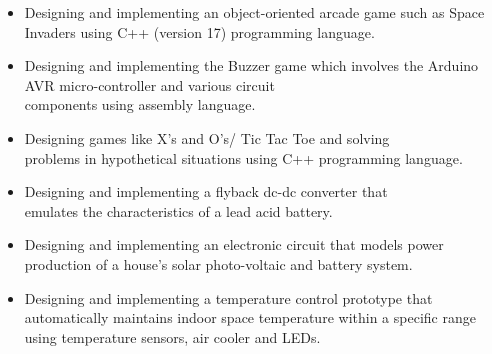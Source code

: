 \documentclass[10pt,a4paper,ragged2e]{altacv}
\begin{document}

\begin{itemize}
    \item Designing and implementing an object-oriented arcade game such as Space Invaders using C++ (version 17) programming language.
    \item Designing and implementing the Buzzer game which involves the Arduino AVR micro-controller and various circuit\\ components using assembly language.
    \item Designing games like X’s and O’s/ Tic Tac Toe and solving \\ problems in hypothetical situations using C++ programming language.
\end{itemize}

\begin{itemize}
    \item Designing and implementing a flyback dc-dc converter that\\ emulates the characteristics of a lead acid battery.
    \item Designing and implementing an electronic circuit that models power production of a house's solar photo-voltaic and battery system.
     \item Designing and implementing a temperature control prototype that automatically maintains indoor space temperature within a specific range using temperature sensors, air cooler and LEDs.
\end{itemize}




\nocite{*}



\end{document}
